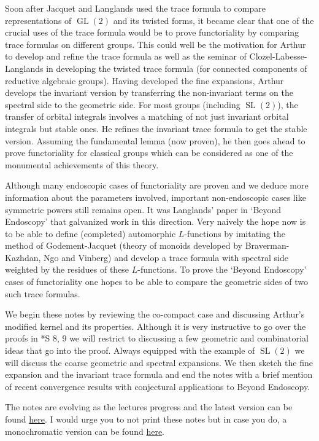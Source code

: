 \documentclass[11pt]{amsart}
\def\gl{\operatorname{GL}}
\def\sl{\operatorname{SL}}
\theoremstyle{remark}
\begin{document}
	Soon after Jacquet and Langlands \cite{MR0401654} used the trace formula to compare representations of $\gl(2)$ and its twisted forms, it became clear that one of the crucial uses of the trace formula would be to prove functoriality by comparing trace formulas on different groups. This could well be the motivation for Arthur to develop and refine the trace formula as well as the seminar of Clozel-Labesse-Langlands in developing the twisted trace formula (for connected components of reductive algebraic groups). Having developed the fine expansions, Arthur develops the invariant version by transferring the non-invariant terms on the spectral side to the geometric side. For most groups (including $\sl(2)$), the transfer of orbital integrals involves a matching of not just invariant orbital integrals but stable ones. He refines the invariant trace formula to get the stable version. Assuming the fundamental lemma (now proven), he then goes ahead to prove functoriality for classical groups which can be considered as one of the monumental achievements of this theory. 

	Although many endoscopic cases of functoriality are proven and we deduce more information about the parameters involved, important non-endoscopic cases like symmetric powers still remains open. It was Langlands' paper in `Beyond Endoscopy' \cite{MR2058622} that galvanized work in this direction. Very naively the hope now is to be able to define (completed) automorphic $L$-functions by imitating the method of Godement-Jacquet (theory of monoids developed by Braverman-Kazhdan, Ngo and Vinberg) and develop a trace formula with spectral side weighted by the residues of these $L$-functions. To prove the `Beyond Endoscopy' cases of functoriality one hopes to be able to compare the geometric sides of two such trace formulas. 
	
	We begin these notes by reviewing the co-compact case and discussing Arthur's modified kernel and its properties. Although it is very instructive to go over the proofs in \cite{clay}*{S 8, 9} we will restrict to discussing a few geometric and combinatorial ideas that go into the proof. Always equipped with the example of $\sl(2)$ we will discuss the coarse geometric and spectral expansions. We then sketch the fine expansion and the invariant trace formula and end the notes with a brief mention of recent convergence results with conjectural applications to Beyond Endoscopy. 
	
	The notes are evolving as the lectures progress and the latest version can be found \href{https://www.dropbox.com/s/155lg41rwiberbu/invariant_sl2.pdf?dl=0}{here}. I would urge you to not print these notes but in case you do, a monochromatic version can be found \href{https://www.dropbox.com/s/p8942kgaygr8tfv/invariant_sl2_print.pdf?dl=0}{here}. 
\end{document}
